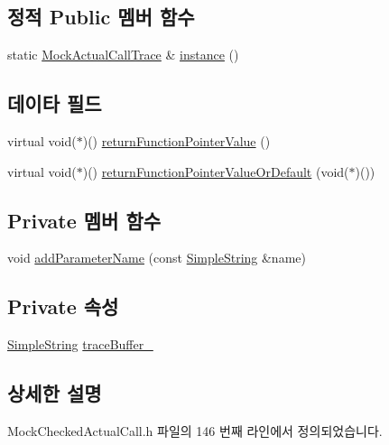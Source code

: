 \subsection*{정적 Public 멤버 함수}
\begin{DoxyCompactItemize}
\item 
static \hyperlink{class_mock_actual_call_trace}{Mock\+Actual\+Call\+Trace} \& \hyperlink{class_mock_actual_call_trace_a78e0ad1856f39448ecd9d678621279c6}{instance} ()
\end{DoxyCompactItemize}
\subsection*{데이타 필드}
\begin{DoxyCompactItemize}
\item 
virtual void($\ast$)() \hyperlink{class_mock_actual_call_trace_abd8adc7ad48025440b2a4aee485f560d}{return\+Function\+Pointer\+Value} ()
\item 
virtual void($\ast$)() \hyperlink{class_mock_actual_call_trace_af9c6303587f8f06ff55e48340ee3db5e}{return\+Function\+Pointer\+Value\+Or\+Default} (void($\ast$)())
\end{DoxyCompactItemize}
\subsection*{Private 멤버 함수}
\begin{DoxyCompactItemize}
\item 
void \hyperlink{class_mock_actual_call_trace_a6957aad0b7b247737e33be49594bf5c9}{add\+Parameter\+Name} (const \hyperlink{class_simple_string}{Simple\+String} \&name)
\end{DoxyCompactItemize}
\subsection*{Private 속성}
\begin{DoxyCompactItemize}
\item 
\hyperlink{class_simple_string}{Simple\+String} \hyperlink{class_mock_actual_call_trace_ab139777fb0949c9d0fbdb4d8b2e63351}{trace\+Buffer\+\_\+}
\end{DoxyCompactItemize}


\subsection{상세한 설명}


Mock\+Checked\+Actual\+Call.\+h 파일의 146 번째 라인에서 정의되었습니다.



